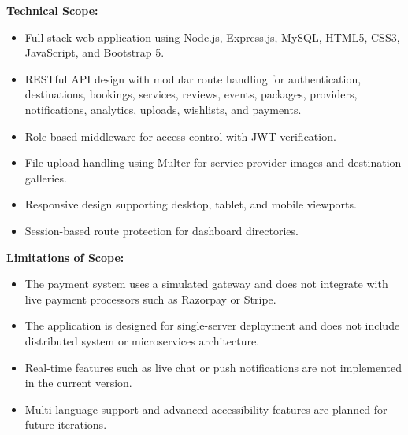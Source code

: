\textbf{Technical Scope:}
\begin{itemize}[leftmargin=2em]
    \item Full-stack web application using Node.js, Express.js, MySQL, HTML5, CSS3, JavaScript, and Bootstrap 5.
    \item RESTful API design with modular route handling for authentication, destinations, bookings, services, reviews, events, packages, providers, notifications, analytics, uploads, wishlists, and payments.
    \item Role-based middleware for access control with JWT verification.
    \item File upload handling using Multer for service provider images and destination galleries.
    \item Responsive design supporting desktop, tablet, and mobile viewports.
    \item Session-based route protection for dashboard directories.
\end{itemize}

\textbf{Limitations of Scope:}
\begin{itemize}[leftmargin=2em]
    \item The payment system uses a simulated gateway and does not integrate with live payment processors such as Razorpay or Stripe.
    \item The application is designed for single-server deployment and does not include distributed system or microservices architecture.
    \item Real-time features such as live chat or push notifications are not implemented in the current version.
    \item Multi-language support and advanced accessibility features are planned for future iterations.
\end{itemize}
